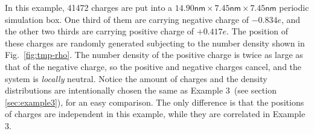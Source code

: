\documentclass[aps,pre,preprint,unsortedaddress]{revtex4}
\renewcommand{\v}[1]{\textbf{\textit{#1}}}
\begin{document}
In this example,  41472 charges are put into a
$14.90\textsf{nm}\times 7.45\textsf{nm}\times 7.45\textsf{nm}$
periodic simulation box. One third of
them are carrying negative charge of $-0.834e$, and the other two thirds
are carrying positive charge of $+0.417e$.
The position of these charges
are randomly generated subjecting to the number density shown in
Fig.~\ref{fig:tmp-rho}.  The number density of the  positive
charge   is twice as large as that of the negative charge,
so the
positive and negative charges cancel, and the
system is \emph{locally} neutral. Notice the amount of charges
and the density distributions are intentionally chosen the same as
Example 3~(see section \ref{sec:example3}), 
for an easy comparison.  The only difference is that the positions
of charges are independent  in this example,
while they are correlated in Example 3.

\end{document}
